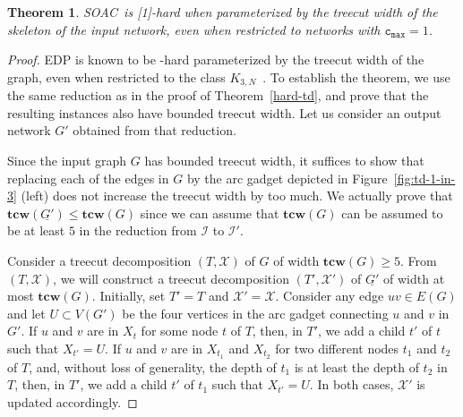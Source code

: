 \documentclass[letterpaper]{article} %
\newtheorem{theorem}{Theorem}
\newcommand{\problem}{{\sc SOAC}\xspace} %
\newcommand{\cmax}{\mathtt{c_{max}}}
\newcommand{\tcw}{{\mathbf{tcw}}}
\begin{document}
\begin{theorem}
\label{W1-tcw}
\problem\ is \W\textup{[1]}-hard when parameterized by the treecut width of the skeleton of the input network, even when restricted to networks with $\cmax=1$.
\end{theorem}

\begin{proof}
\textsc{EDP} is known to be \W[1]-hard parameterized by the treecut width of the graph, even when restricted to the class $K_{3,N}$~\cite{GanianO21}. To establish the theorem, we use the same reduction as in the proof of Theorem~\ref{hard-td}, and prove that the resulting instances also have bounded treecut width. Let us consider an output network $G'$ obtained from that reduction.

Since the input graph $G$ has bounded treecut width, it suffices to show that replacing each of the edges in $G$ by the arc gadget depicted in Figure~\ref{fig:td-1-in-3} (left) does not increase the treecut width by too much.
We actually prove that $\tcw(\underline{G'})\leq \tcw(G)$ since we can assume that $\tcw(G)$ can be assumed to be at least $5$ in the reduction from $\mathcal{I}$ to $\mathcal{I}'$.

Consider a treecut decomposition $(T,\mathcal{X})$ of $G$ of width $\tcw(G)\geq 5$.
From $(T,\mathcal{X})$, we will construct a treecut decomposition $(T',\mathcal{X}')$ of $\underline{G'}$ of width at most $\tcw(G)$.
Initially, set $T'=T$ and $\mathcal{X}'=\mathcal{X}$.
Consider any edge $uv\in E(G)$ and let $U\subset V(G')$ be the four vertices in the arc gadget connecting $u$ and $v$ in $G'$.
If $u$ and $v$ are in $X_t$ for some node $t$ of $T$, then, in $T'$, we add a child $t'$ of $t$ such that $X_{t'}=U$.
If $u$ and $v$ are in $X_{t_1}$ and $X_{t_2}$ for two different nodes $t_1$ and $t_2$ of $T$, and, without loss of generality, the depth of $t_1$ is at least the depth of $t_2$ in $T$, then, in $T'$, we add a child $t'$ of $t_1$ such that $X_{t'}=U$.
In both cases, $\mathcal{X}'$ is updated accordingly.


\end{proof}
\end{document}
